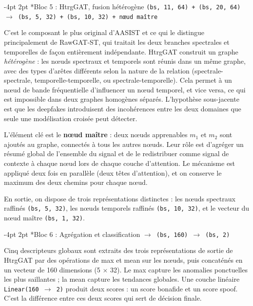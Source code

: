 \documentclass[10pt, a4paper]{article}
\makeatletter
\renewcommand{\subsubsection}{\@startsection{subsubsection}{3}{\z@}%
  {-4pt \@plus -1pt \@minus -1pt}{2pt \@plus 1pt}%
  {\normalfont\normalsize\bfseries\itshape}}
\makeatother
\begin{document}
\subsubsection*{Bloc 5 : HtrgGAT, fusion hétérogène \texttt{(bs, 11, 64) + (bs, 20, 64) $\rightarrow$ (bs, 5, 32) + (bs, 10, 32) + nœud maître}}

C'est le composant le plus original d'AASIST et ce qui le distingue principalement de RawGAT-ST, qui traitait les deux branches spectrales et temporelles de façon entièrement indépendante. HtrgGAT construit un graphe \textit{hétérogène} : les nœuds spectraux et temporels sont réunis dans un même graphe, avec des types d'arêtes différents selon la nature de la relation (spectrale-spectrale, temporelle-temporelle, ou spectrale-temporelle). Cela permet à un nœud de bande fréquentielle d'influencer un nœud temporel, et vice versa, ce qui est impossible dans deux graphes homogènes séparés. L'hypothèse sous-jacente est que les deepfakes introduisent des incohérences entre les deux domaines que seule une modélisation croisée peut détecter.

L'élément clé est le \textbf{nœud maître} : deux nœuds apprenables $m_1$ et $m_2$ sont ajoutés au graphe, connectés à tous les autres nœuds. Leur rôle est d'agréger un résumé global de l'ensemble du signal et de le redistribuer comme signal de contexte à chaque nœud lors de chaque couche d'attention. Le mécanisme est appliqué deux fois en parallèle (deux têtes d'attention), et on conserve le maximum des deux chemins pour chaque nœud.

En sortie, on dispose de trois représentations distinctes : les nœuds spectraux raffinés \texttt{(bs, 5, 32)}, les nœuds temporels raffinés \texttt{(bs, 10, 32)}, et le vecteur du nœud maître \texttt{(bs, 1, 32)}.

\subsubsection*{Bloc 6 : Agrégation et classification \texttt{$\rightarrow$ (bs, 160) $\rightarrow$ (bs, 2)}}

Cinq descripteurs globaux sont extraits des trois représentations de sortie de HtrgGAT par des opérations de max et mean sur les nœuds, puis concaténés en un vecteur de 160 dimensions (5 $\times$ 32). Le max capture les anomalies ponctuelles les plus saillantes ; la mean capture les tendances globales. Une couche linéaire \texttt{Linear(160 $\rightarrow$ 2)} produit deux scores : un score bonafide et un score spoof. C'est la différence entre ces deux scores qui sert de décision finale.
\end{document}
